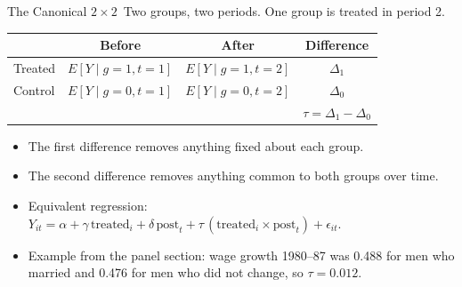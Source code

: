 \documentclass[aspectratio=169,11pt,xcolor=dvipsnames]{beamer}
\newcommand{\E}{E}
\newcommand{\core}{\,\raisebox{0.6pt}{\textcolor{corestar}{$\bigstar$}}}
\begin{document}
\begin{frame}{The Canonical $2\times 2$\core}
Two groups, two periods. One group is treated in period 2.
\begin{center}\small
\renewcommand{\arraystretch}{1.35}
\begin{tabular}{lccc}
\toprule
 & Before & After & Difference \\
\midrule
Treated & $\E[Y\mid g{=}1,t{=}1]$ & $\E[Y\mid g{=}1,t{=}2]$ & $\Delta_1$ \\
Control & $\E[Y\mid g{=}0,t{=}1]$ & $\E[Y\mid g{=}0,t{=}2]$ & $\Delta_0$ \\
\midrule
 & & & $\tau = \Delta_1 - \Delta_0$ \\
\bottomrule
\end{tabular}
\end{center}
\vskip4pt
\begin{itemize}\itemsep2pt
  \item The first difference removes anything fixed about each group.
  \item The second difference removes anything common to both groups over time.
  \item Equivalent regression:
        $Y_{it} = \alpha + \gamma\,\text{treated}_i + \delta\,\text{post}_t
        + \tau\,(\text{treated}_i \times \text{post}_t) + \epsilon_{it}$.
  \item Example from the panel section: wage growth 1980--87 was 0.488 for men who
        married and 0.476 for men who did not change, so $\tau = 0.012$.
\end{itemize}
\end{frame}
\end{document}
